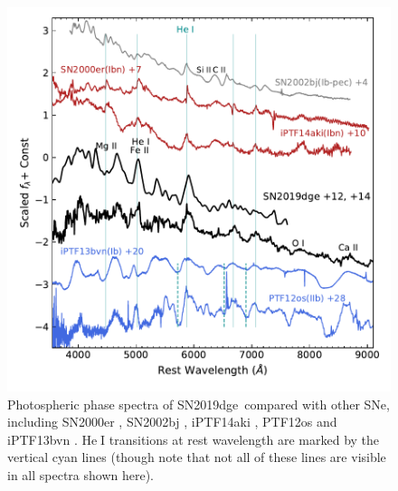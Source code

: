 \documentclass[twocolumn]{aastex63}
\newcommand{\name}{SN2019dge}
\def\ion#1#2{#1$\;${\footnotesize\rm{#2}}\relax}
\begin{document}
\begin{CJK*}{UTF8}{gbsn}
\begin{figure}[htbp!]
	\centering
	\includegraphics[width=\columnwidth]{figures/hst_opt.pdf}
	\caption{Photospheric phase spectra of \name\ compared with 
		other SNe, including SN2000er \citep{Pastorello2008}, SN2002bj \citep{Poznanski2010}, iPTF14aki 
		\citep{Hosseinzadeh2017}, PTF12os and iPTF13bvn \citep{Fremling2016}. \ion{He}{I} transitions at 
		rest wavelength are marked by the vertical cyan lines (though note that not all of these lines are 
		visible in all spectra shown here).
		\label{fig:hst_opt}}
\end{figure}


\end{CJK*}
\end{document}
